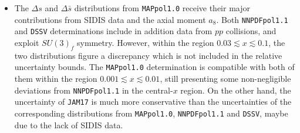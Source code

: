 \begin{itemize}
  \item The $\Delta s$ and $\Delta \bar{s}$ distributions from \texttt{MAPpol1.0} receive their major contributions from SIDIS data and the axial moment $a_8$. Both \texttt{NNPDFpol1.1} and \texttt{DSSV} determinations include in addition data from $pp$ collisions, and exploit $SU(3)_f$ symmetry. However, within the region $0.03 \lesssim x \lesssim 0.1$, the two distributions figure a discrepancy which is not included in the relative uncertainty bounds. The \texttt{MAPpol1.0} determination is compatible with both of them within the region $0.001 \lesssim x \lesssim 0.01$, still presenting some non-negligible deviations from \texttt{NNPDFpol1.1} in the central-$x$ region. On the other hand, the uncertainty of \texttt{JAM17} is much more conservative than the uncertainties of the corresponding distributions from \texttt{MAPpol1.0}, \texttt{NNPDFpol1.1} and \texttt{DSSV}, maybe due to the lack of SIDIS data.
\end{itemize}

